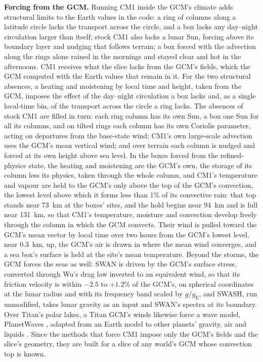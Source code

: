 \textbf{Forcing from the GCM.} Running CM1 inside the GCM's climate adds structural limits to the Earth values
in the code: a ring of columns along a latitude circle lacks the transport across the circle, and a box lacks
any day--night circulation larger than itself; stock CM1 also lacks a lunar Sun, forcing above its boundary
layer and nudging that follows terrain; a box forced with the advection along the rings alone rained in the mornings and
stayed clear and hot in the afternoons. CM1 receives what the slice lacks from the GCM's fields, which the GCM computed with the Earth values that remain in it. For the two structural absences, a
heating and moistening by local time and height, taken from the GCM, imposes the effect of the day--night
circulation a box lacks and, as a single local-time bin, of the transport across the circle a ring lacks. The
absences of stock CM1 are filled in turn: each ring column has its own Sun, a box one Sun for all its columns,
and on tilted rings each column has its own Coriolis parameter, acting on departures from the base-state wind;
CM1's own large-scale advection uses the GCM's mean vertical wind; and over terrain each column is
nudged and forced at its own height above sea level. In the boxes forced from the refined-physics state, the heating and
moistening are the GCM's own, the storage of its column less its physics, taken through the whole column, and
CM1's temperature and vapour are held to the GCM's only above the top of the GCM's convection, the lowest level
above which it forms less than 1\% of its convective rain: that top stands near 73~km at the boxes' sites, and the
hold begins near 94~km and is full near 131~km, so that CM1's temperature, moisture and convection develop freely
through the column in which the GCM convects. Their wind is pulled toward the GCM's mean vector by local time over two hours from
the GCM's lowest level, near 0.3~km, up, the GCM's air is drawn in where the mean wind converges, and a sea box's
surface is held at the site's mean temperature. Beyond the storms, the GCM forces the seas as well: SWAN is driven by the GCM's surface stress, converted through Wu's drag law inverted to an
equivalent wind, so that its friction velocity is within $-2.5$ to $+1.2$\% of the GCM's, on spherical
coordinates at the lunar radius and with its frequency band scaled by $g/g_\mathrm{E}$, and SWASH, run
unmodified, takes lunar gravity as an input and SWAN's spectra at its boundary. Over Titan's polar
lakes, a Titan GCM's winds likewise force a wave model, PlanetWaves \autocite{detelich2026modeling}, adapted from an
Earth model to other planets' gravity, air and liquids \autocite{schneck2026modeling}. Since the methods that force CM1
impose only the GCM's fields and the slice's geometry, they are built for a slice of any world's GCM whose
convection top is known.
